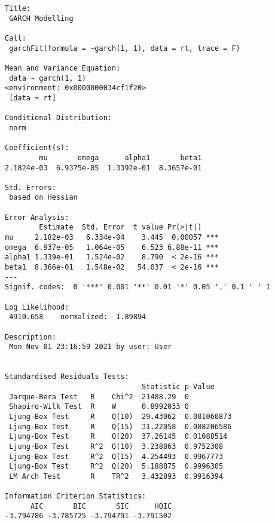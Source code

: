 \documentclass[
  ignorenonframetext,
]{beamer}
\begin{document}
\begin{frame}[fragile]
\begin{verbatim}
Title:
 GARCH Modelling 

Call:
 garchFit(formula = ~garch(1, 1), data = rt, trace = F) 

Mean and Variance Equation:
 data ~ garch(1, 1)
<environment: 0x0000000034cf1f20>
 [data = rt]

Conditional Distribution:
 norm 

Coefficient(s):
        mu       omega      alpha1       beta1  
2.1824e-03  6.9375e-05  1.3392e-01  8.3657e-01  

Std. Errors:
 based on Hessian 

Error Analysis:
        Estimate  Std. Error  t value Pr(>|t|)    
mu     2.182e-03   6.334e-04    3.445  0.00057 ***
omega  6.937e-05   1.064e-05    6.523 6.88e-11 ***
alpha1 1.339e-01   1.524e-02    8.790  < 2e-16 ***
beta1  8.366e-01   1.548e-02   54.037  < 2e-16 ***
---
Signif. codes:  0 '***' 0.001 '**' 0.01 '*' 0.05 '.' 0.1 ' ' 1

Log Likelihood:
 4910.658    normalized:  1.89894 

Description:
 Mon Nov 01 23:16:59 2021 by user: User 


Standardised Residuals Tests:
                                Statistic p-Value    
 Jarque-Bera Test   R    Chi^2  21488.29  0          
 Shapiro-Wilk Test  R    W      0.8992033 0          
 Ljung-Box Test     R    Q(10)  29.43062  0.001060873
 Ljung-Box Test     R    Q(15)  31.22058  0.008206586
 Ljung-Box Test     R    Q(20)  37.26145  0.01088514 
 Ljung-Box Test     R^2  Q(10)  3.238863  0.9752308  
 Ljung-Box Test     R^2  Q(15)  4.254493  0.9967773  
 Ljung-Box Test     R^2  Q(20)  5.188875  0.9996305  
 LM Arch Test       R    TR^2   3.432893  0.9916394  

Information Criterion Statistics:
      AIC       BIC       SIC      HQIC 
-3.794786 -3.785725 -3.794791 -3.791502 
\end{verbatim}
\end{frame}
\end{document}
